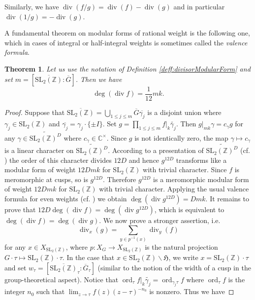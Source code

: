 \documentclass[12pt]{amsart}
\numberwithin{equation}{section}
\theoremstyle{plain}
\newtheorem{thm}{Theorem}[section]
\theoremstyle{definition}
\theoremstyle{remark}
\newcommand\ord{\mathop{\mathrm{ord}}}
\renewcommand\div{\mathop{\mathrm{div}}}
\newcommand\numC{\mathbb{C}}
\newcommand\slZ{\mathrm{SL}_2(\mathbb{Z})}
\newcommand\uhp{\mathfrak{H}}
\newcommand\Dcover[2]{\widetilde{#1^{#2}}}
\begin{document}
Similarly, we have $\div(f/g)=\div(f)-\div(g)$ and in particular $\div(1/g)=-\div(g)$.

A fundamental theorem on modular forms of rational weight is the following one, which in cases of integral or half-integral weights is sometimes called the \emph{valence formula}.
\begin{thm}
\label{thm:valence}
Let us use the notation of Definition \ref{deff:divisorModularForm} and set $m=[\overline{\slZ}\colon\overline{G}]$. Then we have
\begin{equation*}
\deg(\div f)=\frac{1}{12}mk.
\end{equation*}
\end{thm}
\begin{proof}
Suppose that $\overline{\slZ}=\bigcup_{1\leq j\leq m}\overline{G}\overline{\gamma_j}$ is a disjoint union where $\gamma_j\in\slZ$ and $\overline{\gamma_j}=\gamma_j\cdot\{\pm I\}$. Set $g=\prod_{1 \leq j \leq m}f\vert_k\widetilde{\gamma_j}$. Then $g\vert_{mk}\gamma=c_\gamma g$ for any $\gamma\in\Dcover{\slZ}{D}$ where $c_\gamma\in\numC^\times$. Since $g$ is not identically zero, the map $\gamma\mapsto c_\gamma$ is a linear character on $\Dcover{\slZ}{D}$. According to a presentation of $\Dcover{\slZ}{D}$ (cf. \cite[Lemma 5.2]{Zhu23}) the order of this character divides $12D$ and hence $g^{12D}$ transforms like a modular form of weight $12Dmk$ for $\slZ$ with trivial character. Since $f$ is meromorphic at cusps, so is $g^{12D}$. Therefore $g^{12D}$ is a meromorphic modular form of weight $12Dmk$ for $\slZ$ with trivial character. Applying the usual valence formula for even weights (cf. \cite[Theorem 5.6.1]{CS17}) we obtain $\deg(\div g^{12D})=Dmk$. It remains to prove that $12D\deg(\div f)=\deg(\div g^{12D})$, which is equivalent to $\deg(\div f)=\deg(\div g)$. We now prove a stronger assertion, i.e.
\begin{equation}
\label{eq:valenceToProveDivisor}
\div\nolimits_{x}(g)=\sum_{y\in p^{-1}(x)}\div\nolimits_{y}(f)
\end{equation}
for any $x\in X_{\slZ}$, where $p\colon X_G\rightarrow X_{\slZ}$ is the natural projection $G\cdot \tau \mapsto \slZ\cdot \tau$. In the case that $x\in \slZ\backslash\uhp$, we write $x=\slZ\cdot\tau$ and set $w_\tau=[\overline{\slZ}_\tau\colon\overline{G}_\tau]$ (similar to the notion of the width of a cusp in the group-theoretical aspect). Notice that $\ord_\tau f\vert_k\widetilde{\gamma_j}=\ord_{\gamma_j\tau}f$ where $\ord_\tau f$ is the integer $n_0$ such that $\lim_{z\to\tau}f(z)(z-\tau)^{-n_0}$ is nonzero. Thus we have

\end{proof}
\end{document}
